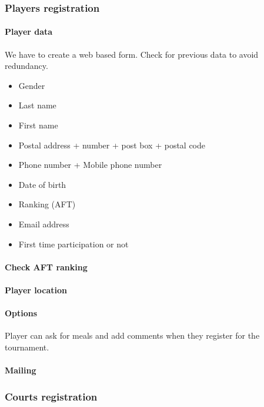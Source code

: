 \subsubsection{Players registration}

\paragraph{Player data}

We have to create a web based form. Check for previous data to avoid
redundancy. \newline

\begin{itemize}
    \item Gender
    \item Last name
    \item First name
    \item Postal address + number + post box + postal code
    \item Phone number + Mobile phone number
    \item Date of birth
    \item Ranking (AFT)
    \item Email address
    \item First time participation or not
\end{itemize}

\paragraph{Check AFT ranking}
\paragraph{Player location}
\paragraph{Options}

Player can ask for meals and add comments when they register for the
tournament.

\paragraph{Mailing}

\subsubsection{Courts registration}


